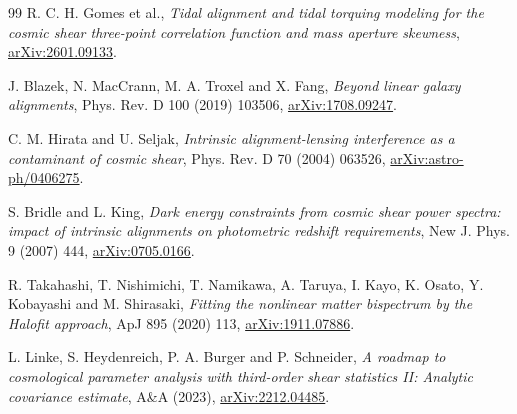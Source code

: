 \documentclass[11pt]{article}
\numberwithin{equation}{section}
\begin{document}
\begin{thebibliography}{99}
R. C. H. Gomes et al.,
\emph{Tidal alignment and tidal torquing modeling for the cosmic
shear three-point correlation function and mass aperture skewness},
\href{https://arxiv.org/abs/2601.09133}{arXiv:2601.09133}.

J. Blazek, N. MacCrann, M. A. Troxel and X. Fang,
\emph{Beyond linear galaxy alignments},
Phys. Rev. D 100 (2019) 103506,
\href{https://arxiv.org/abs/1708.09247}{arXiv:1708.09247}.

C. M. Hirata and U. Seljak,
\emph{Intrinsic alignment-lensing interference as a contaminant of
cosmic shear},
Phys. Rev. D 70 (2004) 063526,
\href{https://arxiv.org/abs/astro-ph/0406275}{arXiv:astro-ph/0406275}.

S. Bridle and L. King,
\emph{Dark energy constraints from cosmic shear power spectra:
impact of intrinsic alignments on photometric redshift
requirements},
New J. Phys. 9 (2007) 444,
\href{https://arxiv.org/abs/0705.0166}{arXiv:0705.0166}.

R. Takahashi, T. Nishimichi, T. Namikawa, A. Taruya, I. Kayo,
K. Osato, Y. Kobayashi and M. Shirasaki,
\emph{Fitting the nonlinear matter bispectrum by the Halofit
approach},
ApJ 895 (2020) 113,
\href{https://arxiv.org/abs/1911.07886}{arXiv:1911.07886}.

L. Linke, S. Heydenreich, P. A. Burger and P. Schneider,
\emph{A roadmap to cosmological parameter analysis with third-order
shear statistics II: Analytic covariance estimate},
A\&A (2023),
\href{https://arxiv.org/abs/2212.04485}{arXiv:2212.04485}.

\end{thebibliography}
\end{document}
